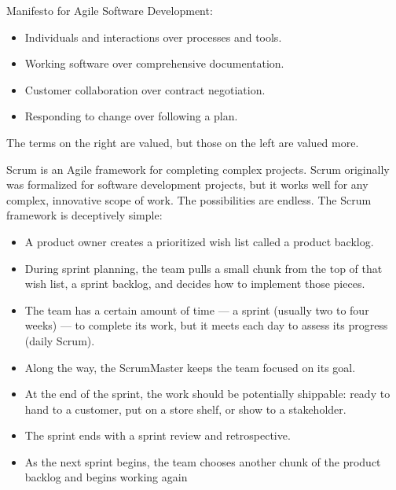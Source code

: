 \documentclass{report}
\begin{document}
Manifesto for Agile Software Development:
\begin{itemize}
\item Individuals and interactions over processes and tools.
\item Working software over comprehensive documentation.
\item Customer collaboration over contract negotiation.
\item Responding to change over following a plan.
\end{itemize}

The terms on the right are valued, but those on the left are valued more.

Scrum is an Agile framework for completing complex projects. Scrum originally was formalized for software development projects, but it works well for any complex, innovative scope of work. The possibilities are endless. The Scrum framework is deceptively simple:

\begin{itemize}
\item A product owner creates a prioritized wish list called a product backlog.
\item During sprint planning, the team pulls a small chunk from the top of that wish list, a sprint backlog, and decides how to implement those pieces.
\item The team has a certain amount of time — a sprint (usually two to four weeks) — to complete its work, but it meets each day to assess its progress (daily Scrum).
\item Along the way, the ScrumMaster keeps the team focused on its goal.
\item At the end of the sprint, the work should be potentially shippable: ready to hand to a customer, put on a store shelf, or show to a stakeholder.
\item The sprint ends with a sprint review and retrospective.
\item As the next sprint begins, the team chooses another chunk of the product backlog and begins working again
\end{itemize}
\end{document}
